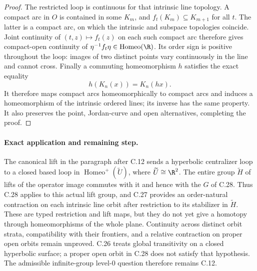 \begin{proof}
The restricted loop is continuous for that intrinsic line topology.
A compact arc in $O$ is contained in some $K_m$, and
$f_t(K_m)\subseteq K_{m+1}$ for all $t$. The latter is a compact arc,
on which the intrinsic and subspace topologies coincide. Joint
continuity of $(t,z)\mapsto f_t(z)$ on each such compact arc therefore
gives compact-open continuity of
$\eta^{-1}f_t\eta\in\operatorname{Homeo}(\R)$.
Its order sign is positive throughout the loop: images of two distinct
points vary continuously in the line and cannot cross. Finally a
commuting homeomorphism $h$ satisfies the exact equality
\[
                  h(K_n(x))=K_n(hx).
\]
It therefore maps compact arcs homeomorphically to compact arcs and
induces a homeomorphism of the intrinsic ordered lines; its inverse
has the same property. It also preserves the point, Jordan-curve and
open alternatives, completing the proof.
\end{proof}

\paragraph{Exact application and remaining step.}
The canonical lift in the paragraph after C.12 sends a hyperbolic
centralizer loop to a closed based loop in
$\operatorname{Homeo}^+(\widetilde U)$, where
$\widetilde U\cong\R^2$. The entire group $\widetilde H$ of lifts of
the operator image commutes with it and hence with the $G$ of C.28.
Thus C.28 applies to this actual lift group, and C.27 provides an
order-natural contraction on each intrinsic line orbit after
restriction to its stabilizer in $\widetilde H$.
These are typed restriction and lift maps, but they do not yet give a
homotopy through homeomorphisms of the whole plane. Continuity across
distinct orbit strata, compatibility with their frontiers, and a
relative contraction on proper open orbits remain unproved.
C.26 treats global transitivity on a closed hyperbolic surface; a
proper open orbit in C.28 does not satisfy that hypothesis. The
admissible infinite-group level-$0$ question therefore remains C.12.
